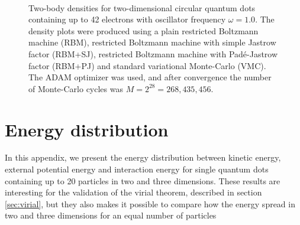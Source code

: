 \begin{landscape}
\begin{figure} [H]
		\\
		
		\caption{Two-body densities for two-dimensional circular quantum dots containing up to 42 electrons with oscillator frequency $\omega=1.0$. The density plots were produced using a plain restricted Boltzmann machine (RBM), restricted Boltzmann machine with simple Jastrow factor (RBM+SJ), restricted Boltzmann machine with Padé-Jastrow factor (RBM+PJ) and standard variational Monte-Carlo (VMC). The  ADAM optimizer was used, and after convergence the number of Monte-Carlo cycles was $M=2^{28}=268,435,456$.}%
		\label{fig:TB_2D_1p0w}
	\end{figure}
\end{landscape}

\section{Energy distribution} \label{sec:energydistribution}
In this appendix, we present the energy distribution between kinetic energy, external potential energy and interaction energy for single quantum dots containing up to 20 particles in two and three dimensions. These results are interesting for the validation of the virial theorem, described in section \ref{sec:virial}, but they also makes it possible to compare how the energy spread in two  and three dimensions for an equal number of particles 

\newpage
